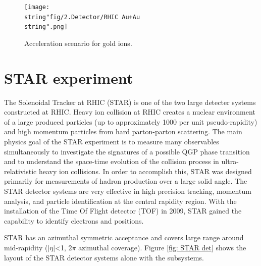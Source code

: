 \begin{figure}
\begin{centering}
\texttt{[image: \\string"fig/2.Detector/RHIC Au+Au\\string".png]}
\par\end{centering}

\protect\caption{Acceleration scenario for gold ions\cite{Adler2003433}.}


\label{fig: ASfor Au}
\end{figure}



\section{STAR experiment}

The Solenoidal Tracker at RHIC (STAR) is one of the two large detecter
systems constructed at RHIC. Heavy ion collision at RHIC creates a
nuclear environment of a large produced particles (up to approximately
1000 per unit pseudo-rapidity) and high momentum particles from hard
parton-parton scattering. The main physics goal of the STAR experiment
is to measure many observables simultaneously to investigate the signatures
of a possible QGP phase transition and to understand the space-time
evolution of the collision process in ultra-relativistic heavy ion
collisions. In order to accomplish this, STAR was designed primarily
for measurements of hadron production over a large solid angle. The
STAR detector systems are very effective in high precision tracking,
momentum analysis, and particle identification at the central rapidity
region. With the installation of the Time Of Flight detector (TOF)
in 2009, STAR gained the capability to identify electrons and positions.

STAR has an azimuthal symmetric acceptance and covers large range
around mid-rapidity ($|\eta|$<1, $2\pi$ azimuthal coverage). Figure
\ref{fig: STAR det} shows the layout of the STAR detector systems
alone with the subsystems. 


